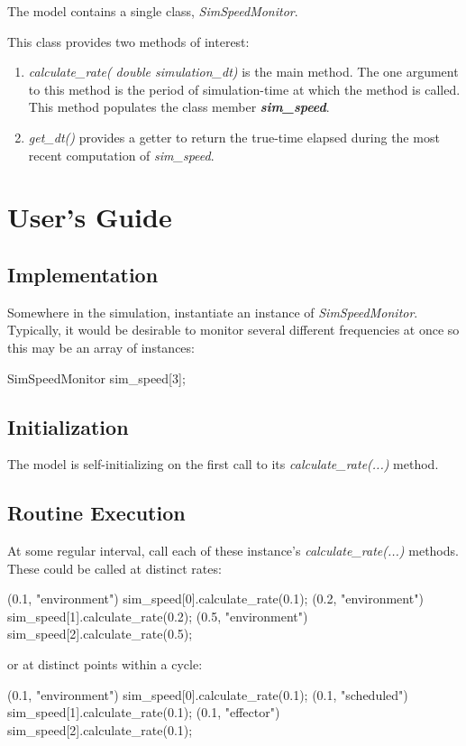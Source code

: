 \documentclass[11pt,fleqn]{report}
\begin{document}
The model contains a single class, \textit{SimSpeedMonitor}.

This class provides two methods of interest:
\begin{enumerate}
\item \textit{calculate\_rate( double simulation\_dt)} is the main method. The
  one argument to this method is the period of simulation-time at which the
  method is called. This method populates the class member
  \textit{\textbf{sim\_speed}}.
\item \textit{get\_dt()} provides a getter to return the true-time elapsed
  during the most recent computation of \textit{sim\_speed}.
\end{enumerate}


\chapter {User's Guide}
\section {Implementation}
Somewhere in the simulation, instantiate an instance of
\textit{SimSpeedMonitor}. Typically, it would be desirable to monitor several
different frequencies at once so this may be an array of instances:

\begin{codeC}
SimSpeedMonitor  sim_speed[3];
\end{codeC}

\section{Initialization}
The model is self-initializing on the first call to its
\textit{calculate\_rate(...)} method.

\section {Routine Execution}
At some regular interval, call each of these instance's
\textit{calculate\_rate(...)} methods. These could be called at distinct rates:

\begin{codeC}
(0.1, "environment") sim_speed[0].calculate_rate(0.1);
(0.2, "environment") sim_speed[1].calculate_rate(0.2);
(0.5, "environment") sim_speed[2].calculate_rate(0.5);
\end{codeC}

or at distinct points within a cycle:
\begin{codeC}
(0.1, "environment") sim_speed[0].calculate_rate(0.1);
(0.1, "scheduled")   sim_speed[1].calculate_rate(0.1);
(0.1, "effector")    sim_speed[2].calculate_rate(0.1);
\end{codeC}
\end{document}
